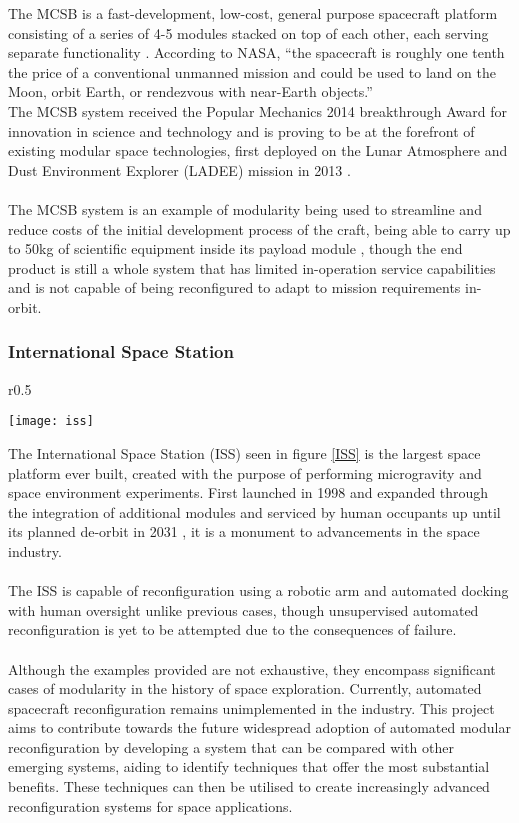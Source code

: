 The MCSB is a fast-development, low-cost, general purpose spacecraft platform consisting of a series of 4-5 modules stacked on top of each other, each serving separate functionality \cite{tietz2009multi}. According to NASA, “the spacecraft is roughly one tenth the price of a conventional unmanned mission and could be used to land on the Moon, orbit Earth, or rendezvous with near-Earth objects.” \cite{MCSBPost} 
\\
The MCSB system received the Popular Mechanics 2014 breakthrough Award for innovation in science and technology \cite{MCSBaward} and is proving to be at the forefront of existing modular space technologies, first deployed on the Lunar Atmosphere and Dust Environment Explorer (LADEE) mission in 2013 \cite{7118961}.
\\\\
The MCSB system is an example of modularity being used to streamline and reduce costs of the initial development process of the craft, being able to carry up to 50kg of scientific equipment inside its payload module \cite{tietz2009multi}, though the end product is still a whole system that has limited in-operation service capabilities and is not capable of being reconfigured to adapt to mission requirements in-orbit.
\subsubsection{International Space Station}
\begin{wrapfigure}{r}{0.5\textwidth}
	\centering
	\vspace{-\baselineskip}
	
	\texttt{[image: iss]}
	\caption{The ISS pictured from the SpaceX Crew Dragon (Dec. 8, 2021). Image from \cite{issImage}}
	\label{ISS}
\end{wrapfigure}
The International Space Station (ISS) seen in figure \ref{ISS} is the largest space platform ever built, created with the purpose of performing microgravity and space environment experiments. First launched in 1998\cite{shaevich2003results} and expanded through the integration of additional modules and serviced by human occupants up until its planned de-orbit in 2031 \cite{ISSdecomission}, it is a monument to advancements in the space industry.
\\\\
The ISS is capable of reconfiguration using a robotic arm and automated docking with human oversight \cite{post2019knowledge} unlike previous cases, though unsupervised automated reconfiguration is yet to be attempted due to the consequences of failure.
\\\\
Although the examples provided are not exhaustive, they encompass significant cases of modularity in the history of space exploration. Currently, automated spacecraft reconfiguration remains unimplemented in the industry. This project aims to contribute towards the future widespread adoption of automated modular reconfiguration by developing a system that can be compared with other emerging systems, aiding to identify techniques that offer the most substantial benefits. These techniques can then be utilised to create increasingly advanced reconfiguration systems for space applications.